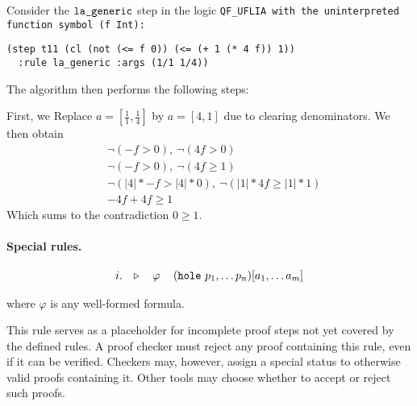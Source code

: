 \begin{example}
Consider the $\tt{la\_generic}$ step in the logic \tt{QF\_UFLIA} with the uninterpreted function symbol \lstinline[language=SMT,basicstyle=\ttfamily\upshape]|(f Int)|:
\begin{lstlisting}[language=SMT,label={lst:lageneric-example}]
(step t11 (cl (not (<= f 0)) (<= (+ 1 (* 4 f)) 1))
  :rule la_generic :args (1/1 1/4))
\end{lstlisting}
%
The algorithm then performs the following steps:

\smallskip

First, we Replace $a = [\frac{1}{1}, \frac{1}{4}]$ by $a = [4, 1]$  due to clearing denominators. We then obtain
\begin{align}
&\neg (- f > 0),~ \neg(4f > 0) \label{eq:step2}\tag{Steps 1 and 2}\\
&\neg (- f > 0),~ \neg(4f \geq 1) \label{eq:step3}\tag{Step 3}\\
&\neg (|4| * - f > |4| * 0 ), ~ \neg(|1| * 4f \geq |1| * 1) \label{eq:step5}\tag{Step 4} \\
&-4f + 4f \geq 1 \label{eq:step6}\tag{Step 5}
\end{align}
Which sums to the contradiction  $0 \geq 1$.
\label{ex:la_generic_example_red}
\end{example}

\paragraph{Special rules.}

\begin{equation}\label{eq:hole}
\begin{tabular}{l c r}
$i.\quad \triangleright$ & $\varphi$ & $(\kw{hole}~p_1, \dots p_n) [a_1, \dots a_m]$
\end{tabular}
\end{equation}

where $\varphi$ is any well-formed formula.

This rule serves as a placeholder for incomplete proof steps not yet covered by the defined rules.
A proof checker must reject any proof containing this rule, even if it can be verified.
Checkers may, however, assign a special status to otherwise valid proofs containing it.
Other tools may choose whether to accept or reject such proofs.



